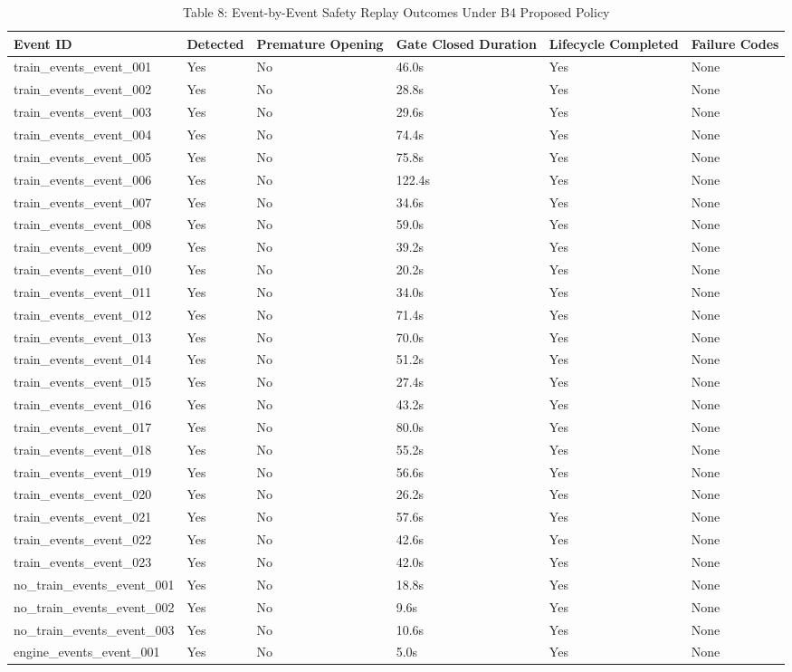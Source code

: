 \begin{table}[t]
\centering
\caption{Table 8: Event-by-Event Safety Replay Outcomes Under B4 Proposed Policy}
\label{tab:table08_multimodal_fusion_b4}
\begin{tabular}{llllll}
\hline
Event ID & Detected & Premature Opening & Gate Closed Duration & Lifecycle Completed & Failure Codes \\
\hline
train\_events\_event\_001 & Yes & No & 46.0s & Yes & None \\
train\_events\_event\_002 & Yes & No & 28.8s & Yes & None \\
train\_events\_event\_003 & Yes & No & 29.6s & Yes & None \\
train\_events\_event\_004 & Yes & No & 74.4s & Yes & None \\
train\_events\_event\_005 & Yes & No & 75.8s & Yes & None \\
train\_events\_event\_006 & Yes & No & 122.4s & Yes & None \\
train\_events\_event\_007 & Yes & No & 34.6s & Yes & None \\
train\_events\_event\_008 & Yes & No & 59.0s & Yes & None \\
train\_events\_event\_009 & Yes & No & 39.2s & Yes & None \\
train\_events\_event\_010 & Yes & No & 20.2s & Yes & None \\
train\_events\_event\_011 & Yes & No & 34.0s & Yes & None \\
train\_events\_event\_012 & Yes & No & 71.4s & Yes & None \\
train\_events\_event\_013 & Yes & No & 70.0s & Yes & None \\
train\_events\_event\_014 & Yes & No & 51.2s & Yes & None \\
train\_events\_event\_015 & Yes & No & 27.4s & Yes & None \\
train\_events\_event\_016 & Yes & No & 43.2s & Yes & None \\
train\_events\_event\_017 & Yes & No & 80.0s & Yes & None \\
train\_events\_event\_018 & Yes & No & 55.2s & Yes & None \\
train\_events\_event\_019 & Yes & No & 56.6s & Yes & None \\
train\_events\_event\_020 & Yes & No & 26.2s & Yes & None \\
train\_events\_event\_021 & Yes & No & 57.6s & Yes & None \\
train\_events\_event\_022 & Yes & No & 42.6s & Yes & None \\
train\_events\_event\_023 & Yes & No & 42.0s & Yes & None \\
no\_train\_events\_event\_001 & Yes & No & 18.8s & Yes & None \\
no\_train\_events\_event\_002 & Yes & No & 9.6s & Yes & None \\
no\_train\_events\_event\_003 & Yes & No & 10.6s & Yes & None \\
engine\_events\_event\_001 & Yes & No & 5.0s & Yes & None \\
\hline
\end{tabular}
\end{table}
